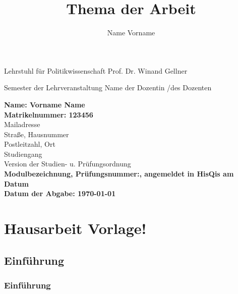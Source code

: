\documentclass{Hausarbeit}
\author{Name Vorname}
\title{Thema der Arbeit}
\begin{document}
\begin{titlepage}

        {Lehrstuhl für Politikwissenschaft}
        {Prof. Dr. Winand Gellner}

    \vspace{4cm}

        {Semester der Lehrveranstaltung}
        {Name der Dozentin /des Dozenten}

    \titel{\thetitle}

    \vspace*{\fill}

    \begin{flushleft}
        \textbf{Name: Vorname Name}\\
        \textbf{Matrikelnummer: 123456}\\[0.5cm]
        Mailadresse\\
        Straße, Hausnummer\\
        Postleitzahl, Ort\\[0.5cm]
        Studiengang\\
        Version der Studien- u. Prüfungsordnung\\[2cm]
        \textbf{Modulbezeichnung, Prüfungsnummer:, angemeldet in HisQis am Datum}\\
        \textbf{Datum der Abgabe: \today}
    \end{flushleft}

\end{titlepage}

\tableofcontents
\newpage

    

    \section{Hausarbeit Vorlage!}
    \subsection{Einführung}
    \subsubsection{Einführung}

    \blindtext
    
    \blindtext

    \blindtext

    \newpage
\end{document}
